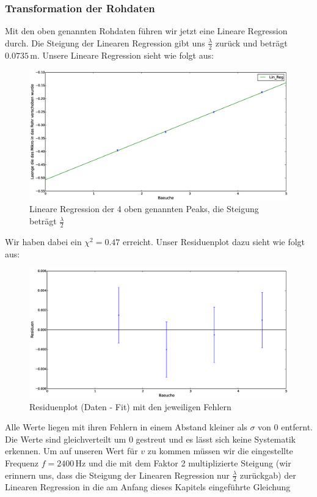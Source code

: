 \documentclass[12pt,a4paper]{article}
\begin{document}
\subsubsection{Transformation der Rohdaten}
Mit den oben genannten Rohdaten führen wir jetzt eine Lineare Regression durch. Die Steigung der Linearen Regression gibt uns $\frac{\lambda}{2}$ zurück und beträgt $0.0735\,$m. Unsere Lineare Regression sieht wie folgt aus:
\begin{figure}[H]
\centering
\includegraphics[scale=0.3]{Bilder/linreg_stehende_welle.eps}
\caption{Lineare Regression der 4 oben genannten Peaks, die Steigung beträgt $\frac{\lambda}{2}$}
\end{figure}
Wir haben dabei ein $\chi^2 = 0.47$ erreicht.
Unser Residuenplot dazu sieht wie folgt aus:
\begin{figure}[H]
\centering
\includegraphics[scale=0.3]{Bilder/residuen_stehende_welle.eps}
\caption{Residuenplot (Daten - Fit) mit den jeweiligen Fehlern}
\end{figure}
Alle Werte liegen mit ihren Fehlern in einem Abstand kleiner als $\sigma$ von 0 entfernt. Die Werte sind gleichverteilt um 0 gestreut und es lässt sich keine Systematik erkennen.\newline
Um auf unseren Wert für $v$ zu kommen müssen wir die eingestellte Frequenz $f = 2400\,$Hz und die mit dem Faktor 2 multiplizierte Steigung (wir erinnern uns, dass die Steigung der Linearen Regression nur $\frac{\lambda}{2}$ zurückgab) der Linearen Regression in die am Anfang dieses Kapitels eingeführte Gleichung
\end{document}
